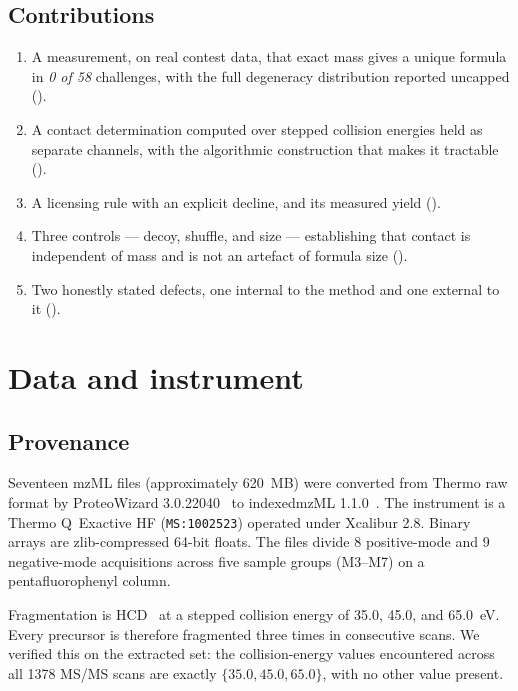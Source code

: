 \documentclass[11pt,twocolumn,a4paper]{article}
\theoremstyle{definition}
\theoremstyle{remark}
\begin{document}
\subsection{Contributions}

\begin{enumerate}[leftmargin=1.6em]
\item A measurement, on real contest data, that exact mass gives a unique formula
in \emph{0 of 58} challenges, with the full degeneracy distribution reported
uncapped ().
\item A contact determination computed over stepped collision energies held as
separate channels, with the algorithmic construction that makes it tractable
().
\item A licensing rule with an explicit decline, and its measured yield
().
\item Three controls --- decoy, shuffle, and size --- establishing that contact
is independent of mass and is not an artefact of formula size
().
\item Two honestly stated defects, one internal to the method and one external to
it ().
\end{enumerate}

\section{Data and instrument}
\label{sec:data}

\subsection{Provenance}

Seventeen mzML files (approximately 620~MB) were converted from Thermo raw format
by ProteoWizard 3.0.22040~\citep{chambers2012crossplatform} to indexedmzML
1.1.0~\citep{martens2011mzml}. The instrument is a Thermo Q~Exactive HF
(\texttt{MS:1002523}) operated under Xcalibur 2.8. Binary arrays are
zlib-compressed 64-bit floats. The files divide 8 positive-mode and 9
negative-mode acquisitions across five sample groups (M3--M7) on a
pentafluorophenyl column.

Fragmentation is HCD~\citep{olsen2007higher} at a stepped collision energy of
35.0, 45.0, and 65.0~eV. Every precursor is therefore fragmented three times in
consecutive scans. We verified this on the extracted set: the collision-energy
values encountered across all 1378 MS/MS scans are exactly $\{35.0, 45.0,
65.0\}$, with no other value present.
\end{document}
